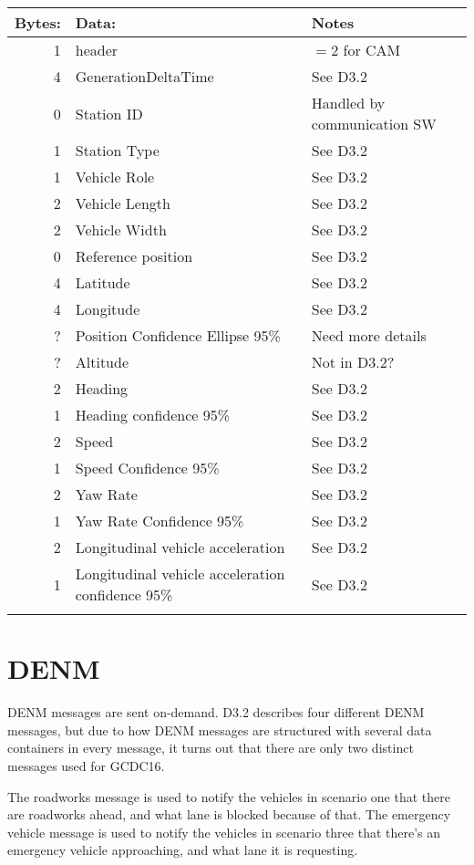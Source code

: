 \documentclass[11pt]{article}
\begin{document}
\begin{center}
\begin{tabular}{rll}
\hline
Bytes: & Data: & Notes\\
\hline
1 & header & \(=2\) for CAM\\
4 & GenerationDeltaTime & See D3.2\\
0 & Station ID & Handled by communication SW\\
1 & Station Type & See D3.2\\
1 & Vehicle Role & See D3.2\\
2 & Vehicle Length & See D3.2\\
2 & Vehicle Width & See D3.2\\
0 & Reference position & See D3.2\\
4 & Latitude & See D3.2\\
4 & Longitude & See D3.2\\
? & Position Confidence Ellipse 95\% & Need more details\\
? & Altitude & Not in D3.2?\\
2 & Heading & See D3.2\\
1 & Heading confidence 95\% & See D3.2\\
2 & Speed & See D3.2\\
1 & Speed Confidence 95\% & See D3.2\\
2 & Yaw Rate & See D3.2\\
1 & Yaw Rate Confidence 95\% & See D3.2\\
2 & Longitudinal vehicle acceleration & See D3.2\\
1 & Longitudinal vehicle acceleration confidence 95\% & See D3.2\\
 &  & \\
\end{tabular}
\end{center}


\newpage
\section{DENM}
\label{sec:orgheadline3}
DENM messages are sent on-demand. D3.2 describes four different DENM
messages, but due to how DENM messages are structured with several
data containers in every message, it turns out that there are only two
distinct messages used for GCDC16.

The roadworks message is used to notify the vehicles in scenario one that
there are roadworks ahead, and what lane is blocked because of that.
The emergency vehicle message is used to notify the vehicles in scenario three
that there's an emergency vehicle approaching, and what lane it is
requesting.
\end{document}

